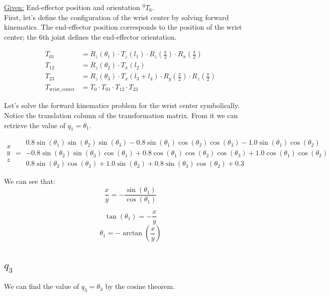 \documentclass{article}
\begin{document}
\underline{Given:} End-effector position and orientation ${}^0T_6$.\\

First, let's define the configuration of the wrist center by solving forward kinematics. 
The end-effector position corresponds to the position of the wrist center; 
the 6th joint defines the end-effector orientation. 

\begin{align*}
    T_{01} &= R_z(\theta_1) \cdot T_z(l_1) \cdot R_z(\frac{\pi}{2}) \cdot R_x(\frac{\pi}{2}) \\
    T_{12} &= R_z(\theta_2) \cdot T_x(l_2) \\
    T_{23} &= R_z(\theta_3) \cdot T_x(l_3 + l_4) \cdot R_y(\frac{\pi}{2}) \cdot R_z(\frac{\pi}{2}) \\
    T_{\text{wrist\_center}} &= T_0 \cdot T_{01} \cdot T_{12} \cdot T_{23}
\end{align*}

Let's solve the forward kinematics problem for the wrist center symbolically.
Notice the translation column of the transformation matrix.  
From it we can retrieve the value of $q_1 = \theta_1$.


\[
\begin{smallmatrix}
    x \\ y \\ z
\end{smallmatrix}
=
\begin{smallmatrix}
    0.8 \sin(\theta_1) \sin(\theta_2) \sin(\theta_3) - 0.8 \sin(\theta_1) \cos(\theta_2) \cos(\theta_3) - 1.0 \sin(\theta_1) \cos(\theta_2) \\
    -0.8 \sin(\theta_2) \sin(\theta_3) \cos(\theta_1) + 0.8 \cos(\theta_1) \cos(\theta_2) \cos(\theta_3) + 1.0 \cos(\theta_1) \cos(\theta_2) \\
    0.8 \sin(\theta_2) \cos(\theta_3) + 1.0 \sin(\theta_2) + 0.8 \sin(\theta_3) \cos(\theta_2) + 0.3
\end{smallmatrix}
\]

We can see that:
\[\frac{x}{y} = -\frac{\sin(\theta_1)}{\cos(\theta_1)}\]

\[\tan(\theta_1) = -\dfrac{x}{y}\]
\[\theta_1 = -\arctan(\dfrac{x}{y})\]

\subsection{$q_3$}

We can find the value of $q_3 = \theta_3$ by the cosine theorem. 
\end{document}
